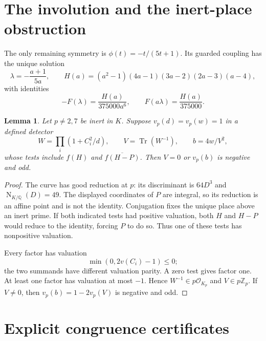 \documentclass[11pt,a4paper]{article}
\newtheorem{lemma}[theorem]{Lemma}
\newcommand{\Q}{\mathbb Q}\newcommand{\Z}{\mathbb Z}
\DeclareMathOperator{\Tr}{Tr}\DeclareMathOperator{\Gal}{Gal}
\begin{document}
\section{The involution and the inert-place obstruction}

The only remaining symmetry is $\phi(t)=-t/(5t+1)$. Its guarded
coupling has the unique solution
\begin{equation}\label{eq:involution}
 \lambda=-\frac{a+1}{5a},\qquad
 H(a)=(a^2-1)(4a-1)(3a-2)(2a-3)(a-4),
\end{equation}
with identities
\begin{equation}\label{eq:H}
                  -F(\lambda)=\frac{H(a)}{375000a^6},
                  \qquad F(a\lambda)=\frac{H(a)}{375000}.
\end{equation}

\begin{lemma}\label{lem:inert}
Let $p\ne2,7$ be inert in $K$. Suppose $v_p(d)=v_p(w)=1$ in
a defined detector
\[
 W=\prod_i(1+C_i^2/d),\qquad V=\Tr(W^{-1}),\qquad b=4w/V^2,
\]
whose tests include $f(H)$ and $\overline{f(H-P)}$.
Then $V=0$ or $v_p(b)$ is negative and odd.
\end{lemma}
\begin{proof}
The curve has good reduction at $p$: its discriminant is $64D^3$
and $\operatorname{N}_{K/\Q}(D)=49$. The displayed coordinates of
$P$ are integral, so its reduction is an affine point and is not
the identity. Conjugation fixes the unique place above an inert prime.
If both indicated tests had positive valuation, both $H$ and $H-P$
would reduce to the identity, forcing $P$ to do so. Thus one of these
tests has nonpositive valuation.

Every factor has valuation
\[
                         \min(0,2v(C_i)-1)\le0;
\]
the two summands have different valuation parity. A zero test gives
factor one. At least one factor has valuation at most $-1$.
Hence $W^{-1}\in p\mathcal O_{K_p}$ and $V\in p\Z_p$. If $V\ne0$,
then $v_p(b)=1-2v_p(V)$ is negative and odd.
\end{proof}

\section{Explicit congruence certificates}
\end{document}
